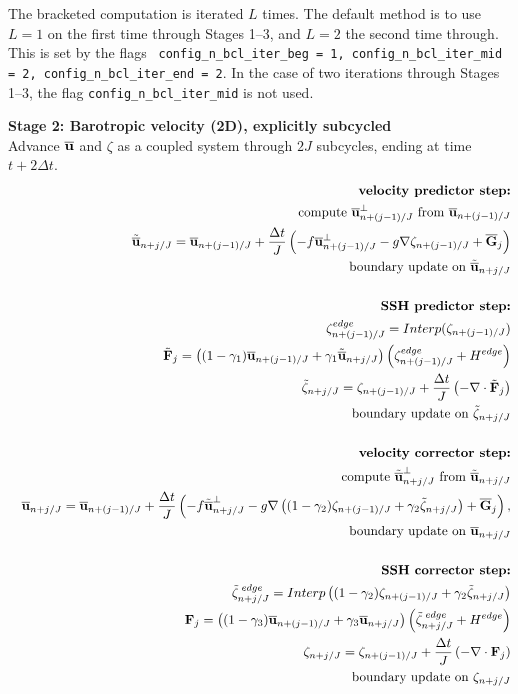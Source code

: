 \documentclass[11pt]{report}
\newcommand{\nn}{\nonumber}
\begin{document}
The bracketed computation is iterated $L$ times.  The default method is to use $L=1$ on the first time through Stages 1--3, and $L=2$ the second time through.  This is set by the flags {\tt
config\_n\_bcl\_iter\_beg = 1, config\_n\_bcl\_iter\_mid = 2, config\_n\_bcl\_iter\_end = 2}.
In the case of two iterations through Stages 1--3, the flag {\tt config\_n\_bcl\_iter\_mid} is not used.

\newpage
{\bf Stage 2: Barotropic velocity (2D), explicitly subcycled}\\
Advance $\overline{\bf u}$ and $\zeta$ as a coupled system through $2J$ subcycles, ending at time $t+2\Delta t$. 
\begin{eqnarray}   
\label{u btr 5} &&
\mbox{{\bf velocity predictor step:}} \nn \\ &&
\mbox{compute }\ubtr_{n+(j-1)/J}^{\perp}\mbox{ from }\ubtr_{n+(j-1)/J} \\ && 
{\tilde \ubtr}_{n+j/J} = \ubtr_{n+(j-1)/J} + \frac{\Delta t}{J} \left(
- f\ubtr_{n+(j-1)/J}^{\perp}
- g\nabla \zeta_{n+(j-1)/J} + {\overline {\bf G}_j}
\right)\\ &&
\mbox{boundary update on }{\tilde \ubtr}_{n+j/J}\\ && 
\nn \\ &&
\mbox{{\bf SSH predictor step:}}\nn \\ &&
\zeta_{n+(j-1)/J}^{edge} = Interp(\zeta_{n+(j-1)/J}) \\ &&
\tilde{\bf F}_j = \left((1-\gamma_1){\ubtr}_{n+(j-1)/J}  + \gamma_1{\tilde \ubtr}_{n+j/J}\right)
\left(\zeta_{n+(j-1)/J}^{edge} + H^{edge} \right)\\ &&
\tilde\zeta_{n+j/J} = \zeta_{n+(j-1)/J} + \frac{\Delta t}{J} \left( -
 \nabla \cdot \tilde{\bf F}_j \right) \\ &&
\mbox{boundary update on } \tilde\zeta_{n+j/J} \\ && 
\nn \\ &&
\mbox{{\bf velocity corrector step:}}\nn \\ &&
\mbox{compute }{\tilde \ubtr}_{n+j/J}^{\perp}\mbox{ from }{\tilde \ubtr}_{n+j/J} \\ && 
\ubtr_{n+j/J} = \ubtr_{n+(j-1)/J} + \frac{\Delta t}{J} \left(
- f{\tilde \ubtr}_{n+j/J}^{\perp}
- g\nabla \left((1-\gamma_2)\zeta_{n+(j-1)/J} + \gamma_2\tilde\zeta_{n+j/J}\right) + {\overline {\bf G}_j}
\right),\\ &&
\mbox{boundary update on }\ubtr_{n+j/J}\\ && 
\nn\\ &&
\mbox{{\bf SSH corrector step:}}\nn \\ &&
\tilde\zeta_{n+j/J}^{\;edge}= Interp\left((1-\gamma_2)\zeta_{n+(j-1)/J} + \gamma_2\tilde\zeta_{n+j/J}\right) \\&&
{\bf F}_j = \left((1-\gamma_3){\ubtr}_{n+(j-1)/J}  + \gamma_3 \ubtr_{n+j/J}\right)
\left(\tilde\zeta_{n+j/J}^{\;edge} + H^{edge} \right)\\ &&
\zeta_{n+j/J} = \zeta_{n+(j-1)/J} + \frac{\Delta t}{J} \left( -
 \nabla \cdot {\bf F}_j \right) \\ &&
\mbox{boundary update on } \zeta_{n+j/J} 
\end{eqnarray}   
\end{document}

